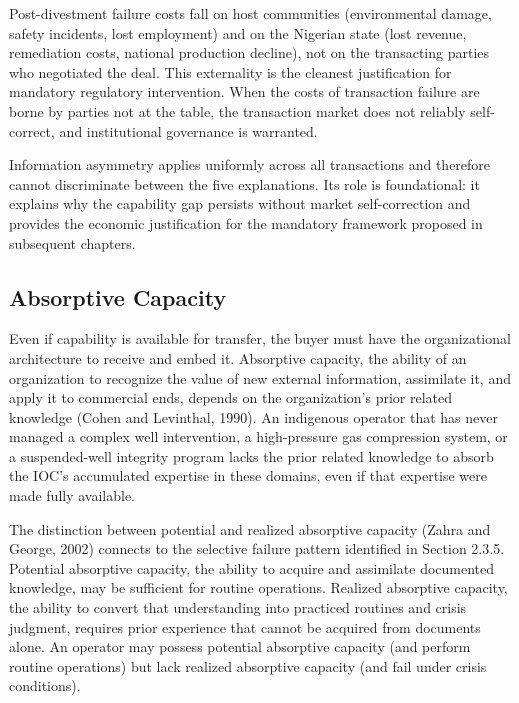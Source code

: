 Post-divestment failure costs fall on host communities (environmental
damage, safety incidents, lost employment) and on the Nigerian state
(lost revenue, remediation costs, national production decline), not on
the transacting parties who negotiated the deal. This externality is the
cleanest justification for mandatory regulatory intervention. When the
costs of transaction failure are borne by parties not at the table, the
transaction market does not reliably self-correct, and institutional
governance is warranted.

Information asymmetry applies uniformly across all transactions and
therefore cannot discriminate between the five explanations. Its role is
foundational: it explains why the capability gap persists without market
self-correction and provides the economic justification for the
mandatory framework proposed in subsequent chapters.

\hypertarget{absorptive-capacity}{%
\subsection{Absorptive Capacity}\label{absorptive-capacity}}

Even if capability is available for transfer, the buyer must have the
organizational architecture to receive and embed it. Absorptive
capacity, the ability of an organization to recognize the value of new
external information, assimilate it, and apply it to commercial ends,
depends on the organization's prior related knowledge (Cohen and
Levinthal, 1990). An indigenous operator that has never managed a
complex well intervention, a high-pressure gas compression system, or a
suspended-well integrity program lacks the prior related knowledge to
absorb the IOC's accumulated expertise in these domains, even if that
expertise were made fully available.

The distinction between potential and realized absorptive capacity
(Zahra and George, 2002) connects to the selective failure pattern
identified in Section 2.3.5. Potential absorptive capacity, the ability
to acquire and assimilate documented knowledge, may be sufficient for
routine operations. Realized absorptive capacity, the ability to convert
that understanding into practiced routines and crisis judgment, requires
prior experience that cannot be acquired from documents alone. An
operator may possess potential absorptive capacity (and perform routine
operations) but lack realized absorptive capacity (and fail under crisis
conditions).

